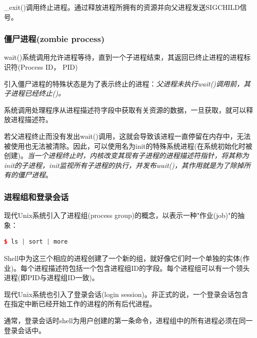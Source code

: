     \_exit()调用终止进程。通过释放进程所拥有的资源并向父进程发送SIGCHILD信号。

\subsubsection{僵尸进程(zombie process)}

    wait()系统调用允许进程等待，直到一个子进程结束，其返回已终止进程的进程标识符(Process ID， PID)

    引入僵尸进程的特殊状态是为了表示终止的进程：\emph{父进程未执行wait()调用前，其子进程已经终止()。}

    系统调用处理程序从进程描述符字段中获取有关资源的数据，一旦获取，就可以释放进程描述符。

    若父进程终止而没有发出wait()调用，这就会导致该进程一直停留在内存中，无法被使用也无法被清除。因此，可以使用名为init的特殊系统进程(在系统初始化时被创建)。\emph{当一个进程终止时，内核改变其现有子进程的进程描述符指针，将其称为init的子进程，init监视所有子进程的执行，并发布wait()，其作用就是为了除掉所有的僵尸进程}。

\subsubsection{进程组和登录会话}

    现代Unix系统引入了进程组(process group)的概念，以表示一种"作业(job)"的抽象：

\begin{lstlisting}[language=C++]
$ ls | sort | more
\end{lstlisting}

    Shell中为这三个相应的进程创建了一个新的组，就好像它们时一个单独的实体(作业)。每个进程描述符包括一个包含进程组ID的字段。每个进程组可以有一个领头进程(即PID与进程组ID一致)。

    现代Unix系统也引入了登录会话(login session)。非正式的说，一个登录会话包含在指定中断已经开始工作的进程的所有后代进程。

    通常，登录会话时shell为用户创建的第一条命令，进程组中的所有进程必须在同一登录会话中。